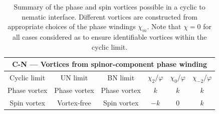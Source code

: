 \begin{table}
    \centering
    \begin{tabular}{cccccc}
        \toprule
        \multicolumn{6}{c}{C-N --- Vortices from spinor-component phase
            winding} \\
        \midrule
        Cyclic limit & UN limit & BN limit & \(\chi_2/\varphi \) &
        \(\chi_0/\varphi \) & \(\chi_{-2}/\varphi \) \\
        \midrule
            Phase vortex & Phase vortex & Phase vortex & \(k\) & \(k\) & \(k\)\\
            Spin vortex & Vortex-free & Spin vortex & \(-k\)
            & 0 & \(k\) \\
        \bottomrule
    \end{tabular}
    \caption[Examples of possible vortex connections across a cyclic to nematic
    interface]{\label{tab: C-N-vortices}Summary of the phase and spin vortices
    possible in a cyclic to nematic interface.
    Different vortices are constructed from appropriate choices of the phase
    windings \(\chi_m\).
    Note that \(\chi=0\) for all cases considered as to
    ensure identifiable vortices within the cyclic limit.}
\end{table}

